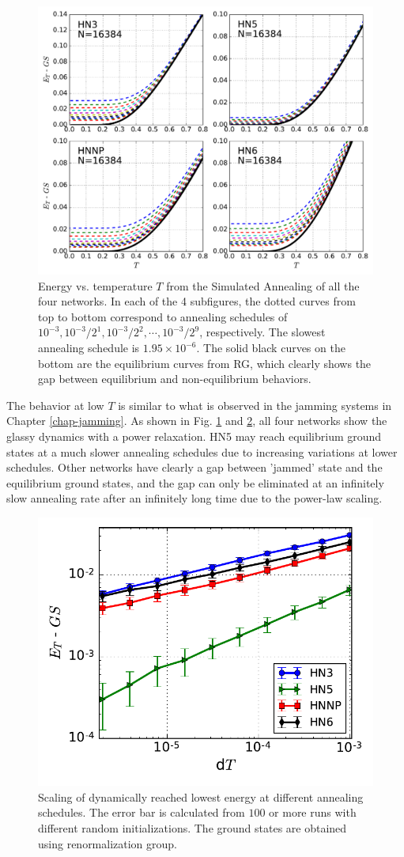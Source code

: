 \begin{figure}
\centering \includegraphics[width=0.9\columnwidth]{Chapter-3/AFM_Jamming_SA_plot}
\protect\caption{Energy vs. temperature $T$ from the Simulated Annealing of all the four networks. In each of the 4 subfigures, the dotted curves from top to bottom correspond to annealing schedules of $10^{-3},  10^{-3}/2^1, 10^{-3}/2^2, \cdots, 10^{-3}/2^9$, respectively. The slowest annealing schedule is $1.95\times10^{-6}$. The solid black curves on the bottom are the equilibrium curves from RG, which clearly shows the gap between equilibrium and non-equilibrium behaviors.}
\label{fig:afm-hnsjam} 
\end{figure}

The behavior at low $T$ is similar to what is observed in the jamming systems in Chapter \ref{chap-jamming}. As shown in Fig. \ref{fig:afm-hnsjam} and \ref{fig:afm-hnsscaling}, all four
 networks show the glassy dynamics with a power relaxation. HN5 may reach equilibrium ground
 states at a much slower annealing schedules due to increasing variations at lower schedules. Other networks have clearly a gap between 'jammed' state and the equilibrium ground states, and the gap can only be eliminated at an infinitely slow annealing rate after an infinitely long time due to the power-law scaling.

\begin{figure}
\centering \includegraphics[width=0.5\columnwidth]{Chapter-3/AFM_Jamming_SA_scaling_plot}
\protect\caption{Scaling of  dynamically reached lowest energy at different annealing schedules. The error bar is calculated from $100$ or more runs with different random initializations. The ground states are obtained using renormalization group.}
\label{fig:afm-hnsscaling} 
\end{figure}

